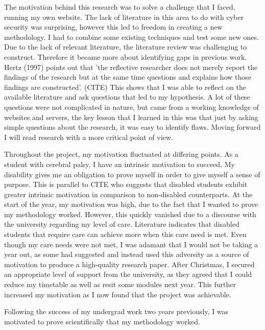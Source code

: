 

The motivation behind this research was to solve a challenge that I faced, running my own website. The lack of literature in this area to do with cyber security was surprising, however this led to freedom in creating a new methodology. I had to combine some existing techniques and test some new ones. Due to the lack of relevant literature, the literature review was challenging to construct. Therefore it became more about identifying gaps in previous work. Hertz (1997) points out that 'the reflective researcher does not merely report the findings of the research but at the same time questions and explains how those findings are constructed'. (CITE) This shows that I was able to reflect on the available literature and ask questions that led to my hypothesis. A lot of these questions were not complicated in nature, but came from a working knowledge of websites and servers, the key lesson that I learned in this was that just by asking simple questions about the research, it was easy to identify flaws. Moving forward I will read research with a more critical point of view.

Throughout the project, my motivation fluctuated at differing points. As a student with cerebral palsy, I have an intrinsic motivation to succeed. My disability gives  me an obligation to prove myself in order to give myself a sense of purpose. This is parallel to CITE who suggests that disabled students exhibit greater intrinsic motivation in comparison to non-disabled counterparts. At the start of the year, my motivation was high, due to the fact that I wanted to prove my methodology worked. However, this quickly vanished due to a discourse with the university regarding my level of care. Literature indicates that disabled students that require care can achieve more when this care need is met. Even though my care needs were not met, I was adamant that I would not be taking a year out, as some had suggested and instead used this adversity as a source of motivation to produce a high-quality research paper. After Christmas, I secured an appropriate level of support from the university, as they agreed that I could reduce my timetable as well as resit some modules next year. This further increased my motivation as I now found that the project was achievable.

Following the success of my undergrad work two years previously, I was motivated to prove scientifically that my methodology worked. 

